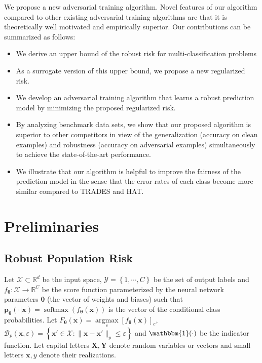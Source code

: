 \documentclass[nohyperref]{article}
\theoremstyle{plain}
\theoremstyle{definition}
\theoremstyle{remark}
\begin{document}
We propose a new adversarial training algorithm. Novel features of our algorithm compared to other existing adversarial training  algorithms are that it is theoretically well motivated and empirically superior. Our contributions can be summarized as follows:
\begin{itemize}
\item We derive an upper bound of the robust risk for multi-classification problems
\item As a surrogate version of this upper bound, we propose
a new regularized risk.
\item We develop an adversarial training algorithm that
learns a robust prediction model by minimizing the proposed regularized risk.
\item By analyzing benchmark data sets, we show that our proposed algorithm is superior to other competitors in view of 
the generalization (accuracy on clean examples) and robustness (accuracy on adversarial examples) simultaneously to achieve the state-of-the-art performance.
\item We illustrate that our algorithm is helpful to improve the fairness of the prediction model in the sense that the error rates of each class become more similar compared to TRADES and HAT.
\end{itemize}
\section{Preliminaries}
\label{sec2}
\subsection{Robust Population Risk} 
\label{sec2_1}
Let $\mathcal{X} \subset \mathbb{R}^d$ be the input space, $\mathcal{Y} = \left\{1, \cdots, C\right\}$
be the set of output labels and $f_{\bm{\theta}} : \mathcal{X} \rightarrow \mathbb{R}^{C}$ be the score function parameterized by the neural network parameters $\bm{\theta}$ (the vector of weights and biases) such that $\mathbf{p}_{\bm{\theta}}(\cdot|\bm{x}) =\operatorname{softmax}(f_{\bm{\theta}}(\bm{x}))$ is the vector of the conditional
class probabilities. Let $F_{\bm{\theta}}(\bm{x}) = \underset{c}{\operatorname{argmax}} [f_{\bm{\theta}}(\bm{x})]_c,$  
$\mathcal{B}_{p}(\bm{x}, \varepsilon) = \left\{\bm{x}' \in \mathcal{X} : \lVert \bm{x}- \bm{x}' \rVert_p \leq \varepsilon \right\}$ and $\mathbbm{1}(\cdot)$ be the indicator function. Let capital letters $\mathbf{X, Y}$ denote random variables or vectors and small letters $\bm{x}, y$ denote their realizations.
\end{document}

